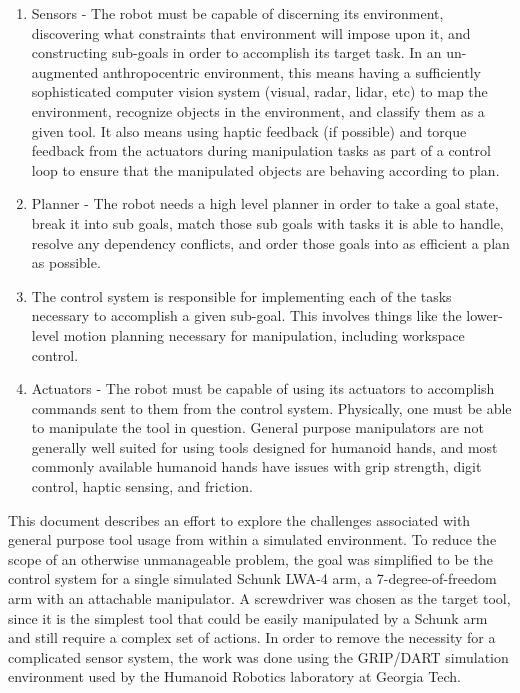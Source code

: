 \documentclass[10pt, conference]{IEEEtran}
\begin{document}
\begin{enumerate}
\item Sensors - The robot must be capable of discerning its environment,
     discovering what constraints that environment will impose upon it,
     and constructing sub-goals in order to accomplish its target
     task. In an un-augmented anthropocentric environment, this means
     having a sufficiently sophisticated computer vision system (visual,
     radar, lidar, etc) to map the environment, recognize objects in the
     environment, and classify them as a given tool. It also means using
     haptic feedback (if possible) and torque feedback from the
     actuators during manipulation tasks as part of a control loop to
     ensure that the manipulated objects are behaving according to
     plan.
\item Planner - The robot needs a high level planner in order to take a
     goal state, break it into sub goals, match those sub goals with
     tasks it is able to handle, resolve any dependency conflicts, and
     order those goals into as efficient a plan as possible.
\item The control system is responsible for implementing each of the
     tasks necessary to accomplish a given sub-goal. This involves
     things like the lower-level motion planning necessary for
     manipulation, including workspace control.
\item Actuators - The robot must be capable of using its actuators to
     accomplish commands sent to them from the control
     system. Physically, one must be able to manipulate the tool in
     question. General purpose manipulators are not generally well
     suited for using tools designed for humanoid hands, and most
     commonly available humanoid hands have issues with grip strength,
     digit control, haptic sensing, and friction.
\end{enumerate}

  This document describes an effort to explore the challenges associated
  with general purpose tool usage from within a simulated
  environment. To reduce the scope of an otherwise unmanageable problem,
  the goal was simplified to be the control system for a single
  simulated Schunk LWA-4 arm, a 7-degree-of-freedom arm with an
  attachable manipulator. A screwdriver was chosen as the target tool,
  since it is the simplest tool that could be easily manipulated by a
  Schunk arm and still require a complex set of actions. In order to
  remove the necessity for a complicated sensor system, the work was
  done using the GRIP/DART simulation environment used by the Humanoid
  Robotics laboratory at Georgia Tech.
\end{document}
